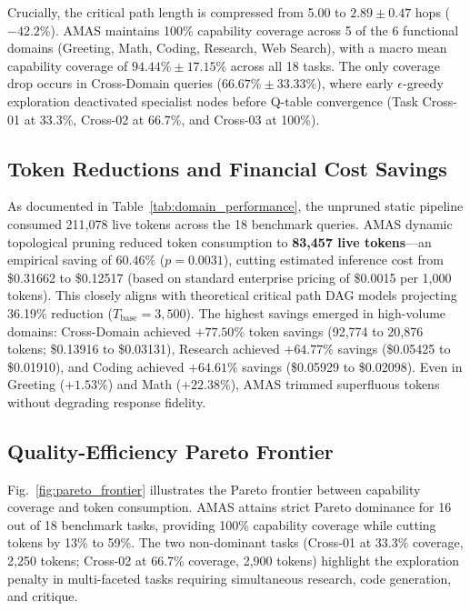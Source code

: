 \documentclass[conference]{IEEEtran}
\begin{document}
Crucially, the critical path length is compressed from 5.00 to $\mathbf{2.89 \pm 0.47}$ hops ($-42.2\%$). AMAS maintains 100\% capability coverage across 5 of the 6 functional domains (Greeting, Math, Coding, Research, Web Search), with a macro mean capability coverage of $\mathbf{94.44\% \pm 17.15\%}$ across all 18 tasks. The only coverage drop occurs in Cross-Domain queries ($66.67\% \pm 33.33\%$), where early $\epsilon$-greedy exploration deactivated specialist nodes before Q-table convergence (Task Cross-01 at 33.3\%, Cross-02 at 66.7\%, and Cross-03 at 100\%).

\subsection{Token Reductions and Financial Cost Savings}
As documented in Table~\ref{tab:domain_performance}, the unpruned static pipeline consumed 211,078 live tokens across the 18 benchmark queries. AMAS dynamic topological pruning reduced token consumption to \textbf{83,457 live tokens}---an empirical saving of $\mathbf{60.46\%}$ ($p = 0.0031$), cutting estimated inference cost from \$0.31662 to \$0.12517 (based on standard enterprise pricing of \$0.0015 per 1,000 tokens). This closely aligns with theoretical critical path DAG models projecting 36.19\% reduction ($T_{\mathrm{base}} = 3,500$). The highest savings emerged in high-volume domains: Cross-Domain achieved $+77.50\%$ token savings (92,774 to 20,876 tokens; \$0.13916 to \$0.03131), Research achieved $+64.77\%$ savings (\$0.05425 to \$0.01910), and Coding achieved $+64.61\%$ savings (\$0.05929 to \$0.02098). Even in Greeting ($+1.53\%$) and Math ($+22.38\%$), AMAS trimmed superfluous tokens without degrading response fidelity.

\subsection{Quality-Efficiency Pareto Frontier}
Fig.~\ref{fig:pareto_frontier} illustrates the Pareto frontier between capability coverage and token consumption. AMAS attains strict Pareto dominance for 16 out of 18 benchmark tasks, providing 100\% capability coverage while cutting tokens by 13\% to 59\%. The two non-dominant tasks (Cross-01 at 33.3\% coverage, 2,250 tokens; Cross-02 at 66.7\% coverage, 2,900 tokens) highlight the exploration penalty in multi-faceted tasks requiring simultaneous research, code generation, and critique.
\end{document}
